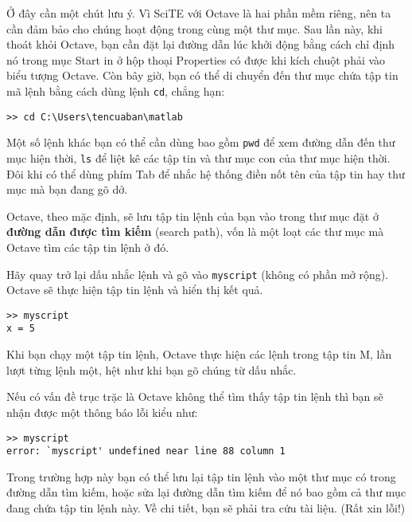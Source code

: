 \documentclass[12pt]{book}
\begin{document}
Ở đây cần một chút lưu ý. Vì SciTE với Octave là hai phần mềm riêng, nên
ta cần đảm bảo cho chúng hoạt động trong cùng một thư mục. Sau lần này,
khi thoát khỏi Octave, bạn cần đặt lại đường dẫn lúc khởi động bằng cách
chỉ định nó trong mục {\sf Start in} ở hộp thoại Properties có được khi kích 
chuột phải vào biểu tượng Octave.
%
Còn bây giờ, bạn có thể di chuyển đến thư mục chứa tập tin mã lệnh bằng
cách dùng lệnh \texttt{cd}, chẳng hạn:
\begin{verbatim}
>> cd C:\Users\tencuaban\matlab
\end{verbatim}
%
Một số lệnh khác bạn có thể cần dùng bao gồm \texttt{pwd} để xem đường dẫn
đến thư mục hiện thời, \texttt{ls} để liệt kê các tập tin và thư mục
con của thư mục hiện thời. Đôi khi có thể dùng phím Tab để nhắc hệ thống 
điền nốt tên của tập tin hay thư mục mà bạn đang gõ dở.
%

Octave, theo mặc định, sẽ lưu tập tin lệnh của bạn vào trong thư
mục đặt ở {\bf đường dẫn được tìm kiếm} (search path), vốn là một
loạt các thư mục mà Octave tìm các tập tin lệnh ở đó.

Hãy quay trở lại dấu nhắc lệnh và gõ vào {\tt myscript} (không có
phần mở rộng). Octave sẽ thực hiện tập tin lệnh
và hiển thị kết quả.

\begin{verbatim}
>> myscript
x = 5
\end{verbatim}
%
Khi bạn chạy một tập tin lệnh, Octave thực hiện các lệnh trong tập
tin M, lần lượt từng lệnh một, hệt như khi bạn gõ chúng từ dấu nhắc.

Nếu có vấn đề trục trặc là Octave không thể tìm thấy tập tin lệnh
thì bạn sẽ nhận được một thông báo lỗi kiểu như:

\begin{verbatim}
>> myscript
error: `myscript' undefined near line 88 column 1
\end{verbatim}
%
Trong trường hợp này bạn có thể lưu lại tập tin lệnh vào một thư mục
có trong đường dẫn tìm kiếm, hoặc sửa lại đường dẫn tìm kiếm để nó
bao gồm cả thư mục đang chứa tập tin lệnh này. Về chi tiết, bạn sẽ phải
tra cứu tài liệu. (Rất xin lỗi!)
\end{document}
